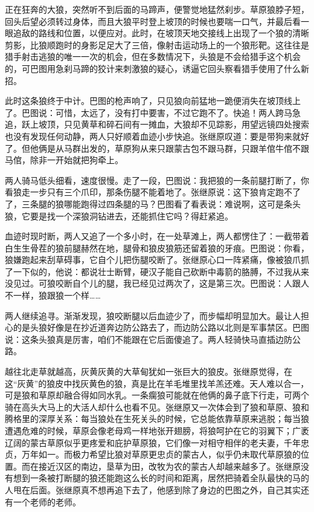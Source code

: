 \par 正在狂奔的大狼，突然听不到后面的马蹄声，便警觉地猛然刹步。草原狼脖子短，回头后望必须转过身体，而且大狼平时登上坡顶的时候也要喘一口气，并最后看一眼追敌的路线和位置，以便应对。此时，在坡顶天地交接线上出现了一个狼的清晰剪影，比狼顺跑时的身影足足大了三倍，像射击运动场上的一个狼形靶。这往往是猎手射击逃狼的唯一一次的机会，但在多数情况下，头狼是不会给猎手这个机会的，可巴图用急刹马蹄的狡计来刺激狼的疑心，诱逼它回头察看猎手使用了什么新招。
\par 此时这条狼终于中计。巴图的枪声响了，只见狼向前猛地一跪便消失在坡顶线上了。巴图说：可惜，太远了，没有打中要害，不过它跑不了。快追！两人跨马急追，跃上坡顶，只见黄草和碎石间有一摊血，大狼却不见踪影，用望远镜四处搜索也没有发现任何动静，两人只好顺着血迹小步快追。张继原叹道：要是带狗来就好了。但他俩是从马群出发的，草原狗从来只跟蒙古包不跟马群，只跟羊倌牛倌不跟马倌，除非一开始就把狗牵上。
\par 两人骑马低头细看，速度很慢。走了一段，巴图说：我把狼的一条前腿打断了，你看狼走一步只有三个爪印，那条伤腿不能着地了。张继原说：这下狼肯定跑不了了，三条腿的狼哪能跑得过四条腿的马？巴图看了看表说：难说啊，这可是条头狼，它要是找一个深狼洞钻进去，还能抓住它吗？得赶紧追。
\par 血迹时现时断，两人又追了一个多小时，在一处草滩上，两人都愣住了：一截带着白生生骨茬的狼前腿赫然在地，腿骨和狼皮狼筋还留着狼的牙痕。巴图说：你看，狼嫌跑起来刮草碍事，它自个儿把伤腿咬断了。张继原心口一阵紧痛，像被狼爪抓了一下似的，他说：都说壮士断臂，硬汉子能自己砍断中毒箭的胳膊，不过我从来没见过。可狼咬断自个儿的腿，我已经见过两次了，这是第三次。巴图说：人跟人不一样，狼跟狼一个样……
\par 两人继续追寻。渐渐发现，狼咬断腿以后血迹少了，而步幅却明显加大。最让人担心的是头狼好像是在抄近道奔边防公路去了，而边防公路以北则是军事禁区。巴图说：这条头狼真是厉害，咱们不能跟在它后面傻追了。两人轻骑快马直插边防公路。
\par 越往北走草就越高，灰黄灰黄的大草甸犹如一张巨大的狼皮。张继原觉得，在这“灰黄”的狼皮中找灰黄色的狼，真是比在羊毛堆里找羊羔还难。天人难以合一，可是狼和草原却融合得如同水乳。一条瘸狼可能就在他俩的鼻子底下行走，可两个骑在高头大马上的大活人却什么也看不见。张继原又一次体会到了狼和草原、狼和腾格里的深厚关系：每当狼处在生死关头的时候，它总能依靠草原来逃脱；每当狼遭遇危难的时候，草原会像老母鸡一样地张开翅膀，将狼呵护在它的羽翼下；广袤辽阔的蒙古草原似乎更疼爱和庇护草原狼，它们像一对相守相伴的老夫妻，千年忠贞，万年如一。而极力希望比狼对草原更忠贞的蒙古人，似乎仍未取代草原狼的位置。而在接近汉区的南边，垦草为田，改牧为农的蒙古人却越来越多了。张继原没有想到一条被打断腿的狼还能跑这么长的时间和距离，居然把骑着全队最快的马的人甩在后面。张继原真不想再追下去了，他感到除了身边的巴图之外，自己其实还有一个老师的老师。
